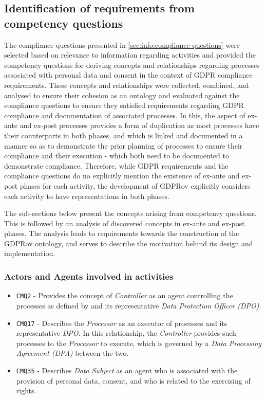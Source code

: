 \subsection{Identification of requirements from competency questions}\label{sec:gdprov:cq}
The compliance questions presented in \autoref{sec:info:compliance-questions} were selected based on relevance to information regarding activities and provided the competency questions for deriving concepts and relationships regarding processes associated with personal data and consent in the context of GDPR compliance requirements. 
These concepts and relationships were collected, combined, and analysed to ensure their cohesion as an ontology and evaluated against the compliance questions to ensure they satisfied requirements regarding GDPR compliance and documentation of associated processes.
In this, the aspect of ex-ante and ex-post processes provides a form of duplication as most processes have their counterparts in both phases, and which is linked and documented in a manner so as to demonstrate the prior planning of processes to ensure their compliance and their execution - which both need to be documented to demonstrate compliance.
Therefore, while GDPR requirements and the compliance questions do no explicitly mention the existence of ex-ante and ex-post phases for each activity, the development of GDPRov explicitly considers each activity to have representations in both phases.

The sub-sections below present the concepts arising from competency questions. 
This is followed by an analysis of discovered concepts in ex-ante and ex-post phases.
The analysis leads to requirements towards the construction of the GDPRov ontology, and serves to describe the motivation behind its design and implementation.

\subsubsection{Actors and Agents involved in activities}
\begin{itemize} 
    \item \texttt{CMQ2} - Provides the concept of \textit{Controller} as an agent controlling the processes as defined by and its representative \textit{Data Protection Officer (DPO)}.
    \item \texttt{CMQ17} - Describes the \textit{Processor} as an executor of processes and its representative \textit{DPO}. In this relationship, the \textit{Controller} provides such processes to the \textit{Processor} to execute, which is governed by a \textit{Data Processing Agreement (DPA)} between the two.
    \item \texttt{CMQ35} - Describes \textit{Data Subject} as an agent who is associated with the provision of personal data, consent, and who is related to the exercising of rights.
\end{itemize}

